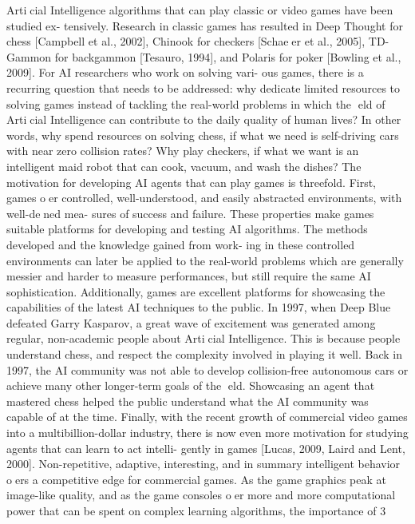 Articial Intelligence algorithms that can play classic or video games have been studied ex-
tensively. Research in classic games has resulted in Deep Thought for chess [Campbell et al., 2002],
Chinook for checkers [Schaeer et al., 2005], TD-Gammon for backgammon [Tesauro, 1994],
and Polaris for poker [Bowling et al., 2009]. For AI researchers who work on solving vari-
ous games, there is a recurring question that needs to be addressed: why dedicate limited
resources to solving games instead of tackling the real-world problems in which the eld of
Articial Intelligence can contribute to the daily quality of human lives? In other words,
why spend resources on solving chess, if what we need is self-driving cars with near zero
collision rates? Why play checkers, if what we want is an intelligent maid robot that can
cook, vacuum, and wash the dishes?
The motivation for developing AI agents that can play games is threefold. First, games
oer controlled, well-understood, and easily abstracted environments, with well-dened mea-
sures of success and failure. These properties make games suitable platforms for developing
and testing AI algorithms. The methods developed and the knowledge gained from work-
ing in these controlled environments can later be applied to the real-world problems which
are generally messier and harder to measure performances, but still require the same AI
sophistication.
Additionally, games are excellent platforms for showcasing the capabilities of the latest
AI techniques to the public. In 1997, when Deep Blue defeated Garry Kasparov, a great
wave of excitement was generated among regular, non-academic people about Articial
Intelligence. This is because people understand chess, and respect the complexity involved
in playing it well. Back in 1997, the AI community was not able to develop collision-free
autonomous cars or achieve many other longer-term goals of the eld. Showcasing an agent
that mastered chess helped the public understand what the AI community was capable of
at the time.
Finally, with the recent growth of commercial video games into a multibillion-dollar
industry, there is now even more motivation for studying agents that can learn to act intelli-
gently in games [Lucas, 2009, Laird and Lent, 2000]. Non-repetitive, adaptive, interesting,
and in summary intelligent behavior oers a competitive edge for commercial games. As
the game graphics peak at image-like quality, and as the game consoles oer more and more
computational power that can be spent on complex learning algorithms, the importance of
3


